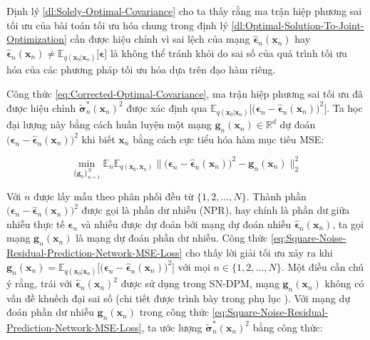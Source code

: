 \documentclass[14pt, a4paper]{article}
\numberwithin{equation}{section}
\numberwithin{figure}{section}
\numberwithin{dl}{section}
\numberwithin{md}{section}
\numberwithin{bd}{section}
\numberwithin{dn}{section}
\numberwithin{hq}{section}
\begin{document}
    Định lý \ref{dl:Solely-Optimal-Covariance} cho ta thấy rằng ma trận hiệp phương sai tối ưu của bài toán tối ưu hóa chung trong định lý \ref{dl:Optimal-Solution-To-Joint-Optimization} cần được hiệu chỉnh vì sai lệch của mạng $\hat{\boldsymbol{\epsilon}}_n (\boldsymbol{x}_n)$ hay $\hat{\boldsymbol{\epsilon}}_n (\boldsymbol{x}_n) \neq \mathbb{E}_{q(\boldsymbol{x}_0 \vert \boldsymbol{x}_n)} \lbrack \boldsymbol{\epsilon} \rbrack$ là không thể tránh khỏi do sai số của quá trình tối ưu hóa của các phương pháp tối ưu hóa dựa trên đạo hàm riêng.

    Công thức \ref{eq:Corrected-Optimal-Covariance}, ma trận hiệp phương sai tối ưu đã được hiệu chỉnh $\tilde{\boldsymbol{\sigma}}_n^{\ast} (\boldsymbol{x}_n)^2$ được xác định qua $\mathbb{E}_{q(\boldsymbol{x}_0 \vert \boldsymbol{x}_n)} \Big\lbrack \big( \boldsymbol{\epsilon}_n - \hat{\boldsymbol{\epsilon}}_n (\boldsymbol{x}_n) \big)^2 \Big\rbrack$.
    Ta học đại lượng này bằng cách huấn luyện một mạng $\boldsymbol{g}_n (\boldsymbol{x}_n) \in \mathbb{R}^d$ dự đoán $\big( \boldsymbol{\epsilon}_n - \hat{\boldsymbol{\epsilon}}_n (\boldsymbol{x}_n) \big)^2$ khi biết $\boldsymbol{x}_n$ bằng cách cực tiểu hóa hàm mục tiêu MSE:

    \begin{equation} \label{eq:Square-Noise-Residual-Prediction-Network-MSE-Loss}
        \min_{\lbrace \boldsymbol{g}_n \rbrace_{n=1}^N} \mathbb{E}_n \mathbb{E}_{q(\boldsymbol{x}_0, \boldsymbol{x}_n)} \lVert \big( \boldsymbol{\epsilon}_n - \hat{\boldsymbol{\epsilon}}_n (\boldsymbol{x}_n) \big)^2 - \boldsymbol{g}_n (\boldsymbol{x}_n)  \rVert_2^2
    \end{equation}

    Với $n$ được lấy mẫu theo phân phối đều từ $\lbrace 1, 2, \dots, N \rbrace$.
    Thành phần $\big( \boldsymbol{\epsilon}_n - \hat{\boldsymbol{\epsilon}}_n (\boldsymbol{x}_n) \big)^2$ được gọi là phần dư nhiễu (NPR),
    hay chính là phần dư giữa nhiễu thực tế $\boldsymbol{\epsilon}_n$ và nhiễu được dự đoán bởi mạng dự đoán nhiễu $\hat{\boldsymbol{\epsilon}}_n (\boldsymbol{x}_n)$,
    ta gọi mạng $\boldsymbol{g}_n (\boldsymbol{x}_n)$ là mạng dự đoán phần dư nhiễu.
    Công thức \ref{eq:Square-Noise-Residual-Prediction-Network-MSE-Loss} cho thấy lời giải tối ưu xảy ra khi $\boldsymbol{g}_n (\boldsymbol{x}_n) = \mathbb{E}_{q(\boldsymbol{x}_0 \vert \boldsymbol{x}_n)} \Big\lbrack \big( \boldsymbol{\epsilon}_n - \hat{\boldsymbol{\epsilon}}_n (\boldsymbol{x}_n) \big)^2 \Big\rbrack$ với mọi $n \in \lbrace 1, 2, \dots, N \rbrace$.
    Một điều cần chú ý rằng, trái với $\hat{\boldsymbol{\epsilon}}_n (\boldsymbol{x}_n)^2$ được sử dụng trong SN-DPM,
    mạng $\boldsymbol{g}_n (\boldsymbol{x}_n)$ không có vấn đề khuếch đại sai số (chi tiết được trình bày trong phụ lục ).
    Với mạng dự đoán phần dư nhiễu $\boldsymbol{g}_n (\boldsymbol{x}_n)$ trong công thức \ref{eq:Square-Noise-Residual-Prediction-Network-MSE-Loss},
    ta ước lượng $\tilde{\boldsymbol{\sigma}}_n^{\ast} (\boldsymbol{x}_n)^2$ bằng công thức:
\end{document}

